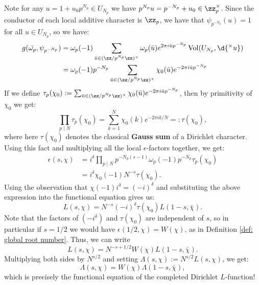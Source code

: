 \documentclass[11pt, x11names, openany]{book}
\begin{document}
\begin{example}
Note for any $ u = 1 + u_0p^{N_p} \in U_{N_p}$ we have $p^{N_p} u = p^{-N_p} + u_0 \in \zz_p^\times$. Since the conductor of each local additive character is $\zz_p$, we have that $\psi_{p^{-N_p}}(u) = 1$ for all $u \in U_{N_p}$,  so we have:
\begin{align*}
    g(\bar{\omega_p}, \psi_{p^{-N_p}}) &= \omega_p(-1) \sum_{\bar{u} \in (\zz/p^{N_p} \zz)^\times} \omega_p(\bar{u}) e^{2 \pi i \bar{u} p^{-N_p}} \vol(U_{N_p}, \d{^\times u})\\
    &= \omega_p(-1) p^{-N_p} \sum_{\bar{u} \in (\zz/p^{N_p} \zz)^\times} \chi_0(\bar{u}) e^{- 2 \pi i \bar{u}p^{-N_p}}
\end{align*}
If we define $\tau_p(\chi_0) := \sum_{\bar{u} \in (\zz/p^{N_p} \zz)^\times} \chi_0(\bar{u}) e^{- 2 \pi i \bar{u}p^{-N_p}}$, then by primitivity of $\chi_0$ we get:
\begin{equation*}
    \prod_{p \mid N} \tau_p(\chi_0) = \sum^N_{k=1} \chi_0(k) e^{- 2 \pi i k/N} =: \tau(\chi_0),
\end{equation*}
where here $\tau(\chi_0)$ denotes the classical \textbf{Gauss sum} of a Dirichlet character. Using this fact and multiplying all the local $\epsilon$-factors together, we get:
\begin{align*}
    \epsilon(s, \chi) &= i^\delta \prod_{p \mid N}p^{-N_p(s - 1)} \omega_p(-1) p^{-N_p} \tau_p(\chi_0)\\
    &= i^\delta \chi_0(-1) N^{-s} \tau(\chi_0).
\end{align*}
Using the observation that $\chi(-1) i^\delta = (-i)^\delta$ and substituting the above expression into the functional equation gives us:
\begin{equation*}
    L(s, \chi) = N^{-s} (-i)^{\delta} \tau(\chi_0) L(1-s, \bar{\chi}).
\end{equation*}
Note that the factors of $(-i^\delta)$ and $\tau(\chi_0)$ are independent of $s$, so in particular if $s = 1/2$ we would have $\epsilon(1/2, \chi) = W(\chi)$, as in Definition \ref{def: global root number}. Thus, we can write
\begin{equation*}
    L(s, \chi) = N^{-s + 1/2} W(\chi) L(1-s, \bar{\chi}).
\end{equation*}
Multiplying both sides by $N^{s/2}$ and setting $\Lambda(s, \chi) := N^{s/2} L(s, \chi)$, we get:
\begin{equation*}
    \Lambda(s, \chi) = W(\chi) \Lambda(1-s, \bar{\chi}),
\end{equation*}
which is precisely the functional equation of the completed Dirichlet $L$-function!
\end{example}
\end{document}
